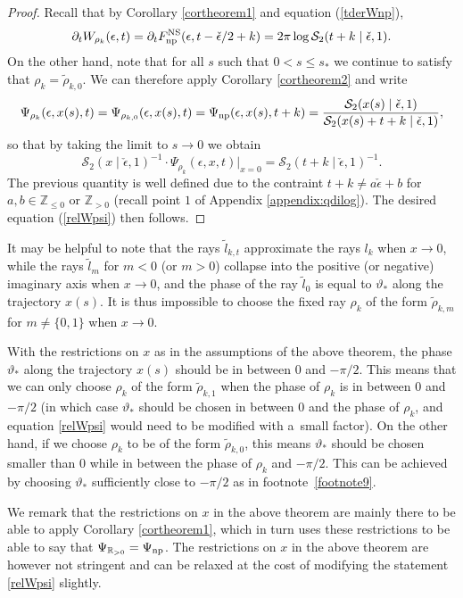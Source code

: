 \documentclass[pdftex]{sigma}
\numberwithin{equation}{section}
\begin{document}
\begin{proof}
Recall that by Corollary \ref{cortheorem1} and equation (\ref{tderWnp}),
\begin{equation*}
 \partial_{t}W_{\rho_k}(\epsilon,t)=\partial_{t}F_{{\rm np}}^{\rm NS}(\epsilon,t-\check\epsilon/2+k)=2\pi \log\mathcal{S}_2(t+k\mid \check\epsilon,1).
\end{equation*}
On the other hand, note that for all $s$ such that $0<s\leq s_*$ we continue to satisfy that $\rho_k=\tilde{\rho}_{k,0}$. We can therefore apply Corollary \ref{cortheorem2} and write
\begin{equation*}%
 \Psi_{\rho_k}(\epsilon,x(s),t)=\Psi_{\rho_{k,0}}(\epsilon,x(s),t) =\Psi_{{\rm np}}(\epsilon,x(s),t+k)=\frac{\mathcal{S}_2(x(s)\mid \check\epsilon,1)}{\mathcal{S}_2(x(s)+t+k\mid \check\epsilon,1)},
\end{equation*}
so that by taking the limit to $s\to 0$ we obtain
\begin{equation*}
 \mathcal{S}_2(x\mid \check\epsilon,1)^{-1}\cdot \Psi_{\rho_k}(\epsilon,x,t)|_{x=0}=\mathcal{S}_2(t+k\mid \check\epsilon,1)^{-1}.
\end{equation*}
The previous quantity is well defined due to the contraint $t+k\neq a\check{\epsilon}+b$ for $a,b\in \mathbb{Z}_{\leq 0}$ or $\mathbb{Z}_{> 0}$ (recall point $1$ of Appendix \ref{appendix:qdilog}).
The desired equation (\ref{relWpsi}) then follows.
\end{proof}

\begin{Remark}\label{remark:thetastar}
It may be helpful to note that the rays $\tilde{l}_{k,t}$ approximate the rays $l_{k}$ when $x \to 0$, while the rays $\tilde{l}_m$ for $m<0$ (or $m>0$) collapse into the positive (or negative) imaginary axis when $x \to 0$, and the phase of the ray $\tilde{l}_0$ is equal to $\vartheta_*$ along the trajectory $x(s)$. It is thus impossible to choose the fixed ray $\rho_k$ of the form $\tilde{\rho}_{k,m}$ for $m \neq \{0,1\}$ when $x \to 0$.

With the restrictions on $x$ as in the assumptions of the above theorem, the phase $\vartheta_*$ along the trajectory $x(s)$ should be in between 0 and $-\pi/2$. This means that we can only choose $\rho_k$ of the form $\tilde{\rho}_{k,1}$ when the phase of $\rho_k$ is in between 0 and $-\pi/2$ (in which case $\vartheta_*$ should be chosen in between 0 and the phase of $\rho_k$, and equation \eqref{relWpsi} would need to be modified with a~small factor). On the other hand, if we choose $\rho_k$ to be of the form $\tilde{\rho}_{k,0}$, this means $\vartheta_*$ should be chosen smaller than 0 while in between the phase of $\rho_k$ and $-\pi/2$. This can be achieved by choosing $\vartheta_*$ sufficiently close to $-\pi/2$ as in footnote~\eqref{footnote9}.

We remark that the restrictions on $x$ in the above theorem are mainly there to be able to apply Corollary \ref{cortheorem1}, which in turn uses these restrictions to be able to say that $\Psi_{\mathbb{R}_{>0}}=\Psi_{{\rm np}}$. The restrictions on $x$ in the above theorem are however not stringent and can be relaxed at the cost of modifying the statement \eqref{relWpsi} slightly.
\end{Remark}
\end{document}
